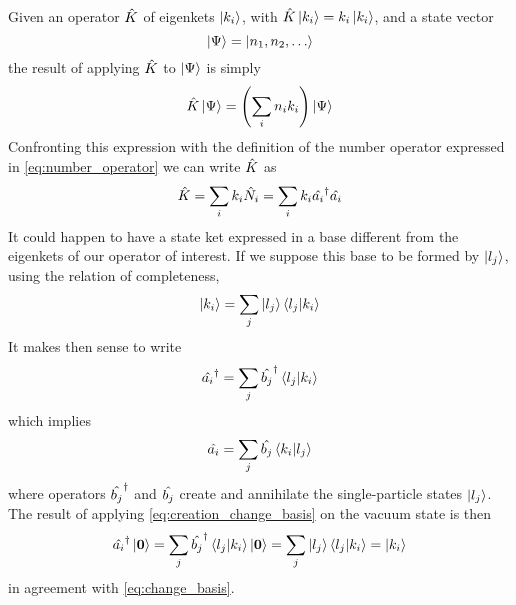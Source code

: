 Given an operator $\hat{K}$ of eigenkets $\ket{k_i}$, with $\hat{K} \ket{k_i} = k_i\ket{k_i}$, and a state vector
\begin{equation}
    \ket{\Psi} = \ket{n_1, n_2, \dots}
\end{equation}
the result of applying $\hat{K}$ to $\ket{\Psi}$ is simply
\begin{equation}
    \hat{K}\ket{\Psi} = \left( \sum_i n_i k_i \right) \ket{\Psi}
\end{equation}
Confronting this expression with the definition of the number operator expressed in \cref{eq:number_operator} we can write $\hat{K}$ as
\begin{equation}
    \label{eq:creation_annihilation_operator}
    \hat{K} = \sum_i k_i \hat{N}_i = \sum_i k_i  \hat{a_i}^\dagger\hat{a_i}
\end{equation}
It could happen to have a state ket expressed in a base different from the eigenkets of our operator of interest. If we suppose this base to be formed by $\ket{l_j}$, using the relation of completeness,
\begin{equation} \label{eq:change_basis}
    \ket{k_i} = \sum_j \ket{l_j} \braket{l_j}{k_i}
\end{equation}
It makes then sense to write
\begin{equation} \label{eq:creation_change_basis}
    \hat{a_i}^\dagger = \sum_j \hat{b_j}^\dagger \braket{l_j}{k_i}
\end{equation}
which implies
\begin{equation}
    \hat{a_i} = \sum_j \hat{b_j} \braket{k_i}{l_j}
\end{equation}
where operators $\hat{b_j}^\dagger$ and $\hat{b_j}$ create and annihilate the single-particle states $\ket{l_j}$. The result of applying \cref{eq:creation_change_basis} on the vacuum state is then
\begin{equation}
    \hat{a_i}^\dagger \ket{\mathbf{\boldsymbol{0}}} = \sum_j \hat{b_j}^\dagger \braket{l_j}{k_i} \ket{\mathbf{\boldsymbol{0}}} = \sum_j \ket{l_j} \braket{l_j}{k_i} = \ket{k_i}
\end{equation}
in agreement with \cref{eq:change_basis}.

